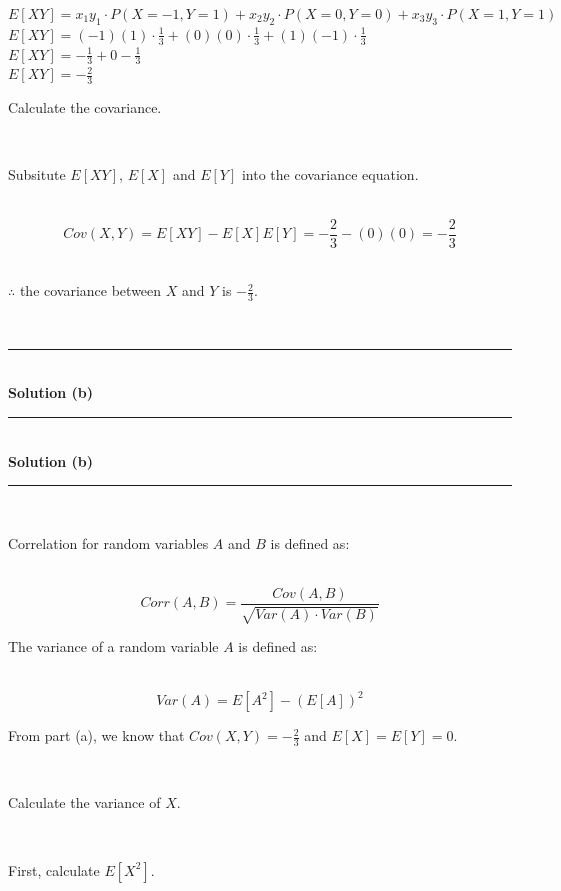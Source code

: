 \documentclass{article}
\begin{document}
$E[XY] = x_1 y_1\cdot P(X=-1,Y=1) + x_2 y_2\cdot P(X=0,Y=0)+ x_3 y_3\cdot P(X=1,Y=1)$\\

$E[XY] = (-1)(1) \cdot \frac{1}{3} + (0)(0) \cdot \frac{1}{3}+ (1)(-1)\cdot \frac{1}{3}$\\

$E[XY] = -\frac{1}{3} + 0 - \frac{1}{3}$\\

$E[XY] = -\frac{2}{3}$\\

\parbox{\textwidth}{Calculate the covariance.}\\

\parbox{\textwidth}{Subsitute $E[XY]$, $E[X]$ and $E[Y]$ into the covariance equation.}\\

$$Cov(X, Y) = E[XY] - E[X]E[Y] = -\frac{2}{3} - (0)(0) = -\frac{2}{3}$$\\

\parbox{\textwidth}{$\therefore$ the covariance between $X$ and $Y$ is $-\frac{2}{3}$.}\\

\noindent\rule{\textwidth}{0.4pt}\\

\textbf{Solution (b)}

\noindent\rule{\textwidth}{0.4pt}\\

\textbf{Solution (b)}

\noindent\rule{\textwidth}{0.4pt}\\

\parbox{\textwidth}{Correlation for random variables $A$ and $B$ is defined as:}\\

$$Corr(A, B) = \frac{Cov(A, B)}{\sqrt{Var(A) \cdot Var(B)}}$$

\parbox{\textwidth}{The variance of a random variable $A$ is defined as:}\\

$$Var(A) = E[A^2] - (E[A])^2$$

\parbox{\textwidth}{From part (a), we know that $Cov(X,Y) = -\frac{2}{3}$ and $E[X] = E[Y] = 0$.}\\

\parbox{\textwidth}{Calculate the variance of $X$.}\\

\parbox{\textwidth}{First, calculate $E[X^2]$.}\\
\end{document}
